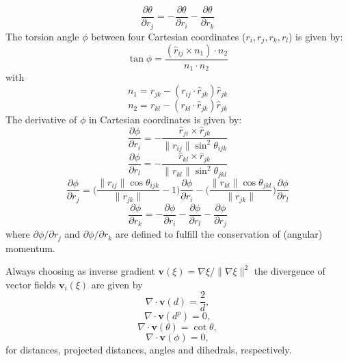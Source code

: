 \begin{equation}
  \frac{\partial \theta}{\partial r_j}= -\frac{\partial \theta}{\partial r_i} - \frac{\partial \theta}{\partial r_k}
\end{equation}
The torsion angle $\phi$ between four Cartesian coordinates ($r_i, r_j, r_k, r_l$) is given by:
\begin{equation}
  \tan \phi = \frac{(\hat{r}_{ij} \times n_1) \cdot n_2}{n_1 \cdot n_2}
\end{equation}
with
\begin{equation}
  n_1 = r_{jk} - (r_{ij} \cdot \hat{r}_{jk})\hat{r}_{jk}
\end{equation}
\begin{equation}
  n_2 = r_{kl} - (r_{kl} \cdot \hat{r}_{jk})\hat{r}_{jk}
\end{equation}
The derivative of $\phi$ in Cartesian coordinates is given by:
\begin{equation}
  \frac{\partial\phi}{\partial r_i} = - \frac{\hat{r}_{ji}\times\hat{r}_{jk}}{\|r_{ij}\|\sin^2\theta_{ijk}}
\end{equation}
\begin{equation}
  \frac{\partial\phi}{\partial r_l} = - \frac{\hat{r}_{kl}\times\hat{r}_{jk}}{\|r_{kl}\|\sin^2\theta_{jkl}}
\end{equation}
\begin{equation}
  \frac{\partial\phi}{\partial r_j} = \bigl(\frac{\|r_{ij} \| \cos\theta_{ijk}}{\|r_{jk} \|}-1\bigr) \frac{\partial\phi}{\partial r_i} - \bigl( \frac{\|r_{kl} \| \cos\theta_{jkl}}{\|r_{jk} \|}\bigr)\frac{\partial\phi}{\partial r_l}
\end{equation}
\begin{equation}
  \frac{\partial\phi}{\partial r_k} = - \frac{\partial\phi}{\partial r_i} - \frac{\partial\phi}{\partial r_l} - \frac{\partial\phi}{\partial r_j}
\end{equation}
where $\partial \phi/\partial r_j$ and $\partial \phi/\partial r_k$ are defined to fulfill the conservation of (angular) momentum.

Always choosing as inverse gradient $\textbf{v}(\xi) = \nabla \xi/\|\nabla \xi \| ^2$ the divergence of vector fields $\textbf{v}_i(\xi)$ are given by
\begin{equation}
  \nabla \cdot \textbf{v}(d) = \frac{2}{d},
\end{equation}
\begin{equation}
  \nabla \cdot \textbf{v}(d^p) = 0,
\end{equation}
\begin{equation}
  \nabla \cdot \textbf{v}(\theta) = \cot \theta,
\end{equation}
\begin{equation}
  \nabla \cdot \textbf{v}(\phi) = 0,
\end{equation}
for distances, projected distances, angles and dihedrals, respectively.


